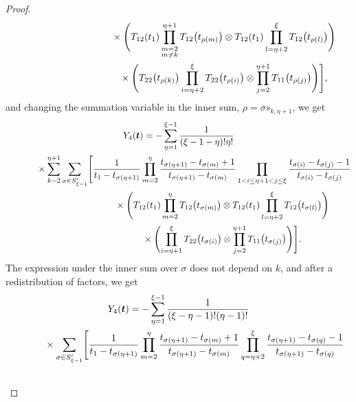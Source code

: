 \documentclass[10pt,a4paper]{amsart}
\numberwithin{equation}{section}
\begin{document}
\begin{proof}
\begin{gather*}
\hphantom{Y_4(\boldsymbol{t})= \times\sum_{k=2}^{\eta+1} \sum_{\rho\in S_{\xi-1}'} \Biggl[}{}
\times\Biggl(T_{12}(t_1) \prod_{\substack{m=2\\m\neq k}}^{\eta+1} T_{12} \bigl(t_{\rho(m)}\bigr) \otimes T_{12}(t_1) \prod_{l=\eta+2}^{\xi } T_{12} \bigl(t_{\rho(l)}\bigr) \Biggr) \\
\hphantom{Y_4(\boldsymbol{t})= \times\sum_{k=2}^{\eta+1} \sum_{\rho\in S_{\xi-1}'} \Biggl[}{}
\times\Biggl( T_{22}\bigl(t_{\rho(k)}\bigr)\prod_{i=\eta+2}^{\xi } T _{22}\bigl(t_{\rho(i)}\bigr)\otimes \prod_{j=2}^{\eta+1} T _{11}\bigl(t_{\rho(j)}\bigr)\Biggr) \Biggr],
\end{gather*}
and changing the summation variable in the inner sum, $\rho=\sigma s_{k,\eta+1}$, we get
\begin{gather*}
 Y_4(\boldsymbol{t})= -\sum_{\eta=1}^{\xi-1} \frac{1}{(\xi-1-\eta) ! \eta!}\\
 \hphantom{Y_4(\boldsymbol{t})=}{}
 \times\sum_{k=2}^{\eta+1}\sum_{\sigma\in S_{\xi-1}'} \Biggl[ \frac{1}{t_1-t_{\sigma(\eta+1)}} \prod_{m=2}^{\eta} \frac{t_{\sigma(\eta+1)}-t_{\sigma(m)}+1}{t_{\sigma(\eta+1)}-t_{\sigma(m)}}\prod_{1< i\leq\eta+1<j \leq \xi} \frac{t_{\sigma(i)}-t_{\sigma(j)}-1}{t_{\sigma(i)}-t_{\sigma(j)}} \\
 \hphantom{Y_4(\boldsymbol{t})=\times\sum_{k=2}^{\eta+1}\sum_{\sigma\in S_{\xi-1}'} \Biggl[}{}
\times\Biggl(T_{12}(t_1) \prod_{m=2}^{\eta} T_{12} \bigl(t_{\sigma(m)}\bigr) \otimes T_{12}(t_1) \prod_{l=\eta+2}^{\xi } T_{12} \bigl(t_{\sigma(l)}\bigr) \Biggr)\\
 \hphantom{Y_4(\boldsymbol{t})=\times\sum_{k=2}^{\eta+1}\sum_{\sigma\in S_{\xi-1}'} \Biggl[}{}
\times \Biggl( \prod_{i=\eta+1}^{\xi } T _{22}\bigl(t_{\sigma(i)}\bigr)\otimes \prod_{j=2}^{\eta+1} T _{11}\bigl(t_{\sigma(j)}\bigr)\Biggr) \Biggr].
\end{gather*}
The expression under the inner sum over $\sigma$ does not depend on $k$, and after a redistribution of factors, we get
\begin{gather}
 Y_4(\boldsymbol{t})= -\sum_{\eta=1}^{\xi-1} \frac{1}{(\xi-\eta-1)!(\eta-1)!}\nonumber\\
 \hphantom{Y_4(\boldsymbol{t})=}{}
 \times\sum_{\sigma\in S_{\xi-1}'} \Biggl[ \frac{1}{t_1-t_{\sigma(\eta+1)}}\prod_{m=2}^{\eta} \frac{t_{\sigma(\eta+1)}-t_{\sigma(m)}+1}{t_{\sigma(\eta+1)}-t_{\sigma(m)}}\prod_{q=\eta+2}^\xi\frac{t_{\sigma(\eta+1)}-t_{\sigma(q)}-1}{t_{\sigma(\eta+1)}-t_{\sigma(q)}}\nonumber\\
 \hphantom{Y_4(\boldsymbol{t})=\times\sum_{\sigma\in S_{\xi-1}'} \Biggl[}{}

\end{gather}
\end{proof}
\end{document}
